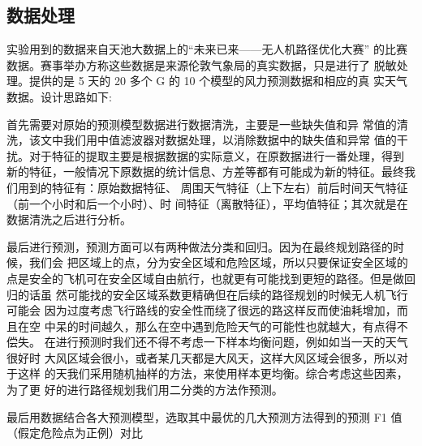 \documentclass[UTF8,a4paper,10pt,nocolorlinks]{ctexart}
\begin{document}
\subsection{数据处理}
实验用到的数据来自天池大数据上的“未来已来——无人机路径优化大赛”
的比赛数据。赛事举办方称这些数据是来源伦敦气象局的真实数据，只是进行了
脱敏处理。提供的是 5 天的 20 多个 G 的 10 个模型的风力预测数据和相应的真
实天气数据。设计思路如下: \par
首先需要对原始的预测模型数据进行数据清洗，主要是一些缺失值和异
常值的清洗，该文中我们用中值滤波器对数据处理，以消除数据中的缺失值和异常
值的干扰。对于特征的提取主要是根据数据的实际意义，在原数据进行一番处理，得到
新的特征，一般情况下原数据的统计信息、方差等都有可能成为新的特征。最终我们用到的特征有：原始数据特征、
周围天气特征（上下左右）前后时间天气特征（前一个小时和后一个小时）、时
间特征（离散特征），平均值特征；其次就是在数据清洗之后进行分析。
\par
最后进行预测，预测方面可以有两种做法分类和回归。因为在最终规划路径的时候，我们会
把区域上的点，分为安全区域和危险区域，所以只要保证安全区域的点是安全的飞机可在安全区域自由航行，也就更有可能找到更短的路径。但是做回归的话虽
然可能找的安全区域系数更精确但在后续的路径规划的时候无人机飞行可能会
因为过度考虑飞行路线的安全性而绕了很远的路这样反而使油耗增加，而且在空
中呆的时间越久，那么在空中遇到危险天气的可能性也就越大，有点得不偿失。
在进行预测时我们还不得不考虑一下样本均衡问题，例如如当一天的天气很好时
大风区域会很小，或者某几天都是大风天，这样大风区域会很多，所以对于这样
的天我们采用随机抽样的方法，来使用样本更均衡。综合考虑这些因素，为了更
好的进行路径规划我们用二分类的方法作预测。\par
最后用数据结合各大预测模型，选取其中最优的几大预测方法得到的预测
F1 值（假定危险点为正例）对比
\end{document}
